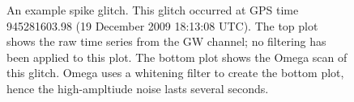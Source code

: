 \begin{figure}[hp]
\center
{}
\label{fig:spike_glitch-example}
\caption{An example spike glitch. This glitch occurred at GPS time 945281603.98
(19 December 2009 18:13:08 UTC). The top plot shows the raw time series from
the GW channel; no filtering has been applied to this plot. The bottom plot
shows the Omega scan of this glitch. Omega uses a whitening filter to create
the bottom plot, hence the high-ampltiude noise lasts several seconds.}
\end{figure}

